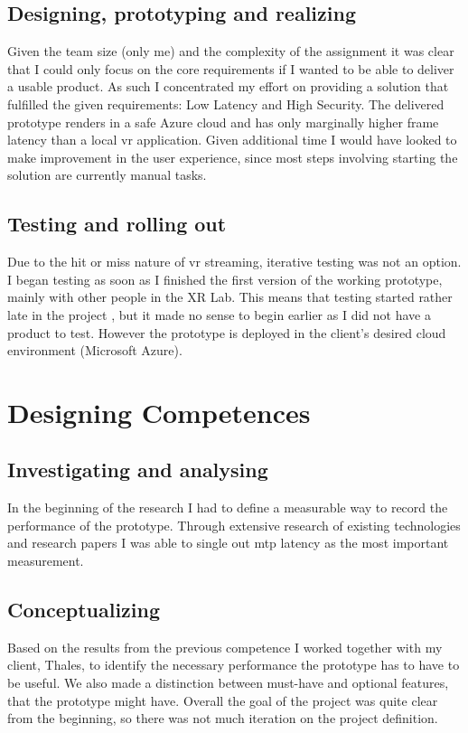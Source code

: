 \documentclass[]{article}
\begin{document}
\subsection{Designing, prototyping and realizing}
Given the team size (only me) and the complexity of the assignment it was clear that I could only focus on the core requirements if I wanted to be able to deliver a usable product. As such I concentrated my effort on providing a solution that fulfilled the given requirements: Low Latency and High Security. The delivered prototype renders in a safe Azure cloud and has only marginally higher frame latency than a local \acrshort{vr} application. Given additional time I would have looked to make improvement in the user experience, since most steps involving starting the solution are currently manual tasks.

\subsection{Testing and rolling out}
Due to the hit or miss nature of \acrshort{vr} streaming, iterative testing was not an option. I began testing as soon as I finished the first version of the working prototype, mainly with other people in the XR Lab. This means that testing started rather late in the project , but it made no sense to begin earlier as I did not have a product to test. However the prototype is deployed in the client's desired cloud environment (Microsoft Azure).

\section{Designing Competences}
\subsection{Investigating and analysing}
In the beginning of the research I had to define a measurable way to record the performance of the prototype. Through extensive research of existing technologies and research papers I was able to single out \acrfull{mtp} latency as the most important measurement. 

\subsection{Conceptualizing}
\label{sec:conc}
Based on the results from the previous competence I worked together with my client, Thales, to identify the necessary performance the prototype has to have to be useful. We also made a distinction between must-have and optional features, that the prototype might have. Overall the goal of the project was quite clear from the beginning, so there was not much iteration on the project definition.
\end{document}

